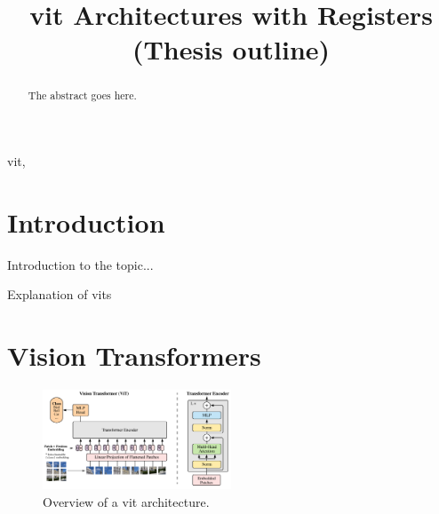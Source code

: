 \documentclass[conference]{IEEEtran}
\begin{document}
\title{\acl{vit} Architectures with Registers (Thesis outline)}

\author{
	}

\maketitle
\begin{abstract}
The abstract goes here.
\end{abstract}

\begin{IEEEkeywords}
	\ac{vit}, 
	\end{IEEEkeywords}

\IEEEpeerreviewmaketitle

\section{Introduction}
Introduction to the topic...

Explanation of \acp{vit} \cite{10.1145/3505244} \cite{visiontransformers2021} \cite{ruan2022visiontransformersstateart} \cite{Liu2024-lm}

\section{Vision Transformers}

\begin{figure}
  \centering
  \includegraphics[width=0.5\textwidth]{figures/vit-architecture.png}
  \caption{Overview of a \ac{vit} architecture. \cite{visiontransformers2021}}
  \label{fig:vit-architecture}
\end{figure}
\end{document}

